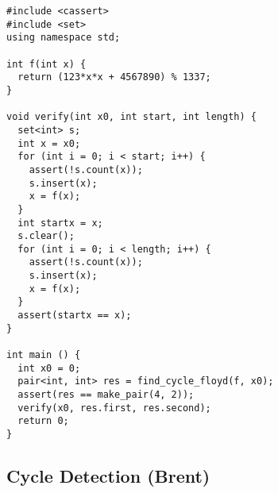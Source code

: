 \begin{lstlisting}
#include <cassert>
#include <set>
using namespace std;

int f(int x) {
  return (123*x*x + 4567890) % 1337;
}

void verify(int x0, int start, int length) {
  set<int> s;
  int x = x0;
  for (int i = 0; i < start; i++) {
    assert(!s.count(x));
    s.insert(x);
    x = f(x);
  }
  int startx = x;
  s.clear();
  for (int i = 0; i < length; i++) {
    assert(!s.count(x));
    s.insert(x);
    x = f(x);
  }
  assert(startx == x);
}

int main () {
  int x0 = 0;
  pair<int, int> res = find_cycle_floyd(f, x0);
  assert(res == make_pair(4, 2));
  verify(x0, res.first, res.second);
  return 0;
}
\end{lstlisting}
\subsection{Cycle Detection (Brent)}

